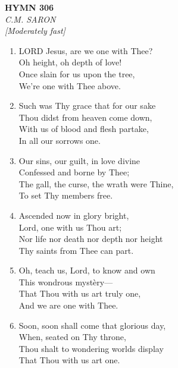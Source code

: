 \documentclass[11pt,a4paper]{article}
\begin{document}
\newpage
\begin{center}
    {\Large \textbf{HYMN 306}}
    \\
    \textit{C.M. SARON}
    \\
    \textit{\small [Moderately fast]}
\end{center}
\vspace{1em}

\begin{enumerate}
    \item LORD Jesus, are we one with Thee? \\
        Oh height, oh depth of love! \\
        Once slain for us upon the tree, \\
        We're one with Thee above.

    \item Such was Thy grace that for our sake \\
        Thou didst from heaven come down, \\
        With us of blood and flesh partake, \\
        In all our sorrows one.

    \item Our sins, our guilt, in love divine \\
        Confessed and borne by Thee; \\
        The gall, the curse, the wrath were Thine, \\
        To set Thy members free.

    \item Ascended now in glory bright, \\
        Lord, one with us Thou art; \\
        Nor life nor death nor depth nor height \\
        Thy saints from Thee can part.

    \item Oh, teach us, Lord, to know and own \\
        This wondrous myst\`ery--- \\
        That Thou with us art truly one, \\
        And we are one with Thee.

    \item Soon, soon shall come that glorious day, \\
        When, seated on Thy throne, \\
        Thou shalt to wondering worlds display \\
        That Thou with us art one.

\end{enumerate}
\end{document}
